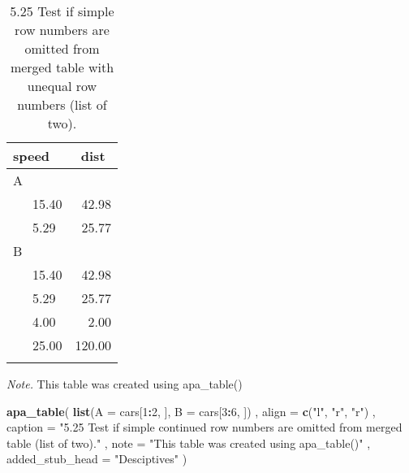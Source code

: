 \documentclass[english,man]{apa6}
\newenvironment{Shaded}{\begin{snugshade}}{\end{snugshade}}
\newcommand{\DataTypeTok}[1]{\textcolor[rgb]{0.13,0.29,0.53}{#1}}
\newcommand{\DecValTok}[1]{\textcolor[rgb]{0.00,0.00,0.81}{#1}}
\newcommand{\KeywordTok}[1]{\textcolor[rgb]{0.13,0.29,0.53}{\textbf{#1}}}
\newcommand{\NormalTok}[1]{#1}
\newcommand{\OperatorTok}[1]{\textcolor[rgb]{0.81,0.36,0.00}{\textbf{#1}}}
\newcommand{\StringTok}[1]{\textcolor[rgb]{0.31,0.60,0.02}{#1}}
\begin{document}
\begin{table}[tbp]

\begin{center}
\begin{threeparttable}

\caption{\label{tab:unnamed-chunk-10}5.25 Test if simple row numbers are omitted from merged table with unequal row numbers (list of two).}

\begin{tabular}{lr}
\toprule
speed & \multicolumn{1}{c}{dist}\\
\midrule
A & \\
\ \ \ 15.40 & 42.98\\
\ \ \ 5.29 & 25.77\\
B & \\
\ \ \ 15.40 & 42.98\\
\ \ \ 5.29 & 25.77\\
\ \ \ 4.00 & 2.00\\
\ \ \ 25.00 & 120.00\\
\bottomrule
\addlinespace
\end{tabular}

\begin{tablenotes}[para]
\normalsize{\textit{Note.} This table was created using apa\_table()}
\end{tablenotes}

\end{threeparttable}
\end{center}

\end{table}

\begin{Shaded}
\begin{Highlighting}[]
\KeywordTok{apa_table}\NormalTok{(}
  \KeywordTok{list}\NormalTok{(}\DataTypeTok{A =}\NormalTok{ cars[}\DecValTok{1}\OperatorTok{:}\DecValTok{2}\NormalTok{, ], }\DataTypeTok{B =}\NormalTok{ cars[}\DecValTok{3}\OperatorTok{:}\DecValTok{6}\NormalTok{, ])}
\NormalTok{  , }\DataTypeTok{align =} \KeywordTok{c}\NormalTok{(}\StringTok{"l"}\NormalTok{, }\StringTok{"r"}\NormalTok{, }\StringTok{"r"}\NormalTok{)}
\NormalTok{  , }\DataTypeTok{caption =} \StringTok{"5.25 Test if simple continued row numbers are omitted from merged table (list of two)."}
\NormalTok{  , }\DataTypeTok{note =} \StringTok{"This table was created using apa_table()"}
\NormalTok{  , }\DataTypeTok{added_stub_head =} \StringTok{"Desciptives"}
\NormalTok{)}
\end{Highlighting}
\end{Shaded}
\end{document}

